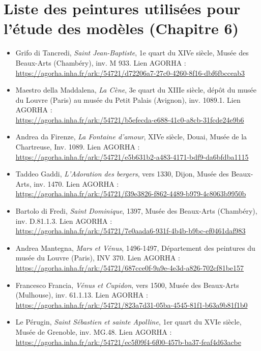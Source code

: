\section[Liste des peintures]{Liste des peintures utilisées pour l'étude des modèles (Chapitre 6)}
\begin{itemize}
\small
    \item Grifo di Tancredi, \textit{Saint Jean-Baptiste}, 1e quart du XIVe siècle, Musée des Beaux-Arts (Chambéry), inv. M 933. Lien AGORHA : \\ \url{https://agorha.inha.fr/ark:/54721/d72206a7-27c0-4260-8f16-dbf6fbcceab3}
    \item Maestro della Maddalena, \textit{La Cène}, 3e quart du XIIIe siècle, dépôt du musée du Louvre (Paris) au musée du Petit Palais (Avignon), inv. 1089.1. Lien AGORHA : \\ \url{https://agorha.inha.fr/ark:/54721/b5efecda-e688-41c0-a8cb-31fcde24e9b6}
    \item Andrea da Firenze, \textit{La Fontaine d'amour}, XIVe siècle, Douai, Musée de la Chartreuse, Inv. 1089. Lien AGORHA : \\ \url{https://agorha.inha.fr/ark:/54721/e5b631b2-a483-4171-bdf9-da6bfdba1115}
    \item Taddeo Gaddi, \textit{L'Adoration des bergers}, vers 1330, Dijon, Musée des Beaux-Arts, inv. 1470. Lien AGORHA : \\ \url{https://agorha.inha.fr/ark:/54721/f39e3826-f862-4489-b979-4c8063b9950b}
    \item Bartolo di Fredi, \textit{Saint Dominique}, 1397, Musée des Beaux-Arts (Chambéry), inv. D.81.1.3. Lien AGORHA : \\ \url{https://agorha.inha.fr/ark:/54721/7e0aada6-931f-4b4b-b9bc-ef0461daf983}
    \item Andrea Mantegna, \textit{Mars et Vénus}, 1496-1497, Département des peintures du musée du Louvre (Paris), INV 370. Lien AGORHA : \\ \url{https://agorha.inha.fr/ark:/54721/687cce0f-9a9e-4e3d-a826-702cf81be157}
    \item Francesco Francia, \textit{Vénus et Cupidon}, vers 1500, Musée des Beaux-Arts (Mulhouse), inv. 61.1.13. Lien AGORHA : \\ \url{https://agorha.inha.fr/ark:/54721/823a7d31-05ba-4545-81f1-b63a9b81f1b0}
    \item Le Pérugin, \textit{Saint Sébastien et sainte Apolline}, 1er quart du XVIe siècle, Musée de Grenoble, inv. MG.48.  Lien AGORHA : \\ \url{https://agorha.inha.fr/ark:/54721/ec5f09f4-6f00-457b-ba37-feaf4d63acbe}

\end{itemize}
